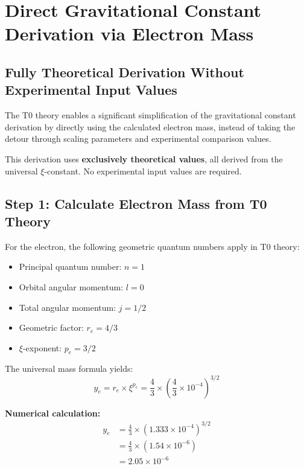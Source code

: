 \documentclass[12pt,a4paper]{article}
\theoremstyle{definition}
\begin{document}
\section{Direct Gravitational Constant Derivation via Electron Mass}
\label{sec:direct_electron_mass_derivation}

\subsection{Fully Theoretical Derivation Without Experimental Input Values}

The T0 theory enables a significant simplification of the gravitational constant derivation by directly using the calculated electron mass, instead of taking the detour through scaling parameters and experimental comparison values.

\begin{important}
	This derivation uses \textbf{exclusively theoretical values}, all derived from the universal $\xi$-constant. No experimental input values are required.
\end{important}

\subsection{Step 1: Calculate Electron Mass from T0 Theory}

For the electron, the following geometric quantum numbers apply in T0 theory:
\begin{itemize}
	\item Principal quantum number: $n = 1$
	\item Orbital angular momentum: $l = 0$ 
	\item Total angular momentum: $j = 1/2$
	\item Geometric factor: $r_e = 4/3$
	\item $\xi$-exponent: $p_e = 3/2$
\end{itemize}

The universal mass formula yields:
\begin{equation}
	y_e = r_e \times \xi^{p_e} = \frac{4}{3} \times \left(\frac{4}{3} \times 10^{-4}\right)^{3/2}
\end{equation}

\textbf{Numerical calculation:}
\begin{align}
	y_e &= \frac{4}{3} \times (1.333 \times 10^{-4})^{3/2} \\
	&= \frac{4}{3} \times (1.54 \times 10^{-6}) \\
	&= 2.05 \times 10^{-6}
\end{align}
\end{document}
